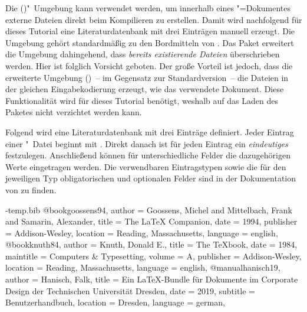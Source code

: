 \documentclass[%
  english,ngerman,%
  cdgeometry=no,DIV=12,%
  automark,%
  listof=toc,%
]{tudscrartcl}
\begin{document}
Die ()"~Umgebung kann verwendet 
werden, um innerhalb eines "=Dokumentes externe Dateien direkt 
beim Kompilieren zu erstellen. Damit wird nachfolgend für dieses Tutorial eine 
Literaturdatenbank  mit drei Einträgen manuell erzeugt. 
Die Umgebung gehört standardmäßig zu den Bordmitteln von . Das 
Paket  erweitert die Umgebung dahingehend, dass 
\emph{bereits existierende Dateien} überschrieben werden. Hier ist folglich 
Vorsicht geboten. Der große Vorteil ist jedoch, dass die erweiterte Umgebung 
()~-- im Gegensatz zur 
Standardversion~-- die Dateien in der gleichen Eingabekodierung erzeugt, wie 
das verwendete Dokument. Diese Funktionalität wird für dieses Tutorial 
benötigt, weshalb auf das Laden des Paketes  nicht 
verzichtet werden kann. 
%
\begin{Preamble}
\usepackage{filecontents}
\end{Preamble}
%
Folgend wird eine Literaturdatenbank mit drei Einträge definiert. Jeder Eintrag 
einer "~Datei beginnt mit . Direkt 
danach ist für jeden Eintrag ein \emph{eindeutiges}  
festzulegen. Anschließend können für unterschiedliche Felder die dazugehörigen 
Werte eingetragen werden. Die verwendbaren Eintragstypen sowie die für den 
jeweiligen Typ obligatorischen und optionalen Felder sind in der Dokumentation 
von  zu finden.
%
\begin{Preamble}
\begin{filecontents}[nosearch]{\jobname-temp.bib}
@book{goossens94,
  author    = {Goossens, Michel and Mittelbach, Frank
               and Samarin, Alexander},
  title     = {The LaTeX Companion},
  date      = {1994},
  publisher = {Addison-Wesley},
  location  = {Reading, Massachusetts},
  language  = {english},
}
@book{knuth84,
  author    = {Knuth, Donald E.},
  title     = {The \TeX book},
  date      = {1984},
  maintitle = {Computers \& Typesetting},
  volume    = {A},
  publisher = {Addison-Wesley},
  location  = {Reading, Massachusetts},
  language  = {english},
}
@manual{hanisch19,
  author    = {Hanisch, Falk},
  title     = {Ein \LaTeX-Bundle für Dokumente im Corporate Design der 
               Technischen Universität Dresden},
  date      = {2019},
  subtitle  = {Benutzerhandbuch},
  location  = {Dresden},
  language  = {german},
}
\end{filecontents}
\end{Preamble}
\end{document}
